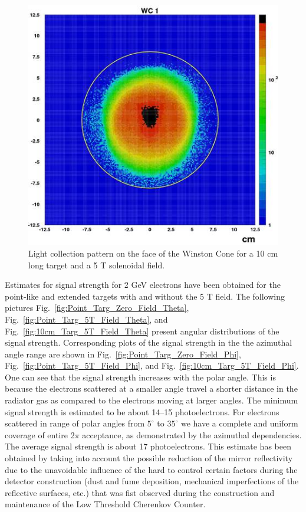 \begin{figure}[!ht]
    \centering
    \includegraphics[width=1.0\linewidth,trim={0.0cm 0.0cm 0.0cm 0.0cm},clip]{images/10cm_Targ_5T_Field_WCone.jpg}
    \caption{Light collection pattern on the face of the Winston Cone for a 10 cm long target and a 5 T solenoidal field.}
    \label{fig:10cm_Targ_5T_Field_WCone}
\end{figure}

Estimates for signal strength for 2 GeV electrons have been obtained for the point-like and extended targets with and without the 5 T field. The following pictures 
Fig.~\ref{fig:Point_Targ_Zero_Field_Theta}, 
Fig.~\ref{fig:Point_Targ_5T_Field_Theta}, and 
Fig.~\ref{fig:10cm_Targ_5T_Field_Theta} 
present angular distributions of the signal strength. Corresponding plots of the signal strength in the the azimuthal angle range are shown in
Fig.~\ref{fig:Point_Targ_Zero_Field_Phi}, 
Fig.~\ref{fig:Point_Targ_5T_Field_Phi}, and 
Fig.~\ref{fig:10cm_Targ_5T_Field_Phi}. One can see that the signal strength increases with the polar angle. This is because the electrons scattered at a smaller angle travel a shorter distance in the radiator gas as compared to the electrons moving at larger angles. The minimum signal strength is estimated to be about 14–15 photoelectrons. For electrons scattered in range of polar angles from $5^\circ$ to $35^\circ$ we have a complete and uniform coverage of entire 2$\pi$ acceptance, as demonstrated by the azimuthal dependencies. The average signal strength is about 17 photoelectrons. This estimate has been obtained by taking into account the possible reduction of the mirror reflectivity due to the unavoidable influence of the hard to control certain factors during the detector construction (dust and fume deposition, mechanical imperfections of the reflective surfaces, etc.) that was fist observed during the construction and maintenance of the Low Threshold Cherenkov Counter.

